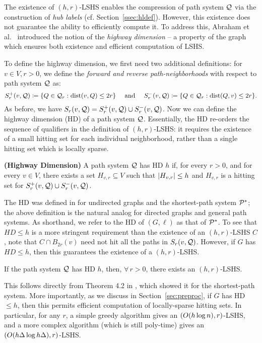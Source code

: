 The existence of $(h,r)$-LSHS enables the compression of path system $\mathcal{Q}$ via the construction of \emph{hub labels} (cf. Section~\ref{ssec:hldef}). However, this existence does not guarantee the ability to efficiently compute it. 
To address this, Abraham et al.~\cite{highway2013} introduced the notion of the \emph{highway dimension} -- a property of the graph which ensures both existence and efficient computation of LSHS. 

To define the highway dimension, we first need two additional definitions:
for $v\in V, r>0$, we define the \emph{forward and reverse path-neighborhoods} with respect to path system $\mathcal{Q}$ as: 
\[
S_r^+(v,\calQ) \defeq\crl*{Q\in\calQ_r: \dist(v,Q)\leq 2r} \quad\text{ and }\quad
S_r^-(v,\calQ) \defeq\crl*{Q\in\calQ_r: \dist(Q,v)\leq 2r}.
\]
As before, we have $S_r(v,\mathcal{Q}) = S_r^+(v,\mathcal{Q})\cup S_r^-(v,\mathcal{Q})$. Now we can define the highway dimension (HD) of a path system $\mathcal{Q}$. Essentially, the HD re-orders the sequence of qualifiers in the definition of $(h,r)$-LSHS: it requires the existence of a small hitting set for each individual neighborhood, rather than a single hitting set which is locally sparse. 
\begin{definition}
	\label{def:hddef}
	\textbf{(Highway Dimension)}
	A path system $\mathcal{Q}$ has HD $h$ if, for every $r>0$, and for every $v\in V$, there exists a set $H_{v,r}\subseteq V$ such that $\lvert H_{v,r}\rvert\leq h$ and $H_{v,r}$ is a hitting set for $S_r^+(v,\mathcal{Q})\cup S_r^-(v,\mathcal{Q})$.
\end{definition}
The HD was defined in \cite{highway2013} for undirected graphs and the shortest-path system $\mathcal{P}^*$; the above definition is the natural analog for directed graphs and general path systems.
As shorthand, we refer to the HD of $(G,\ell)$ as that of $\mathcal{P}^*$. 
To see that $HD\leq h$ is a more stringent requirement than the existence of an $(h,r)$-LSHS $C$, note that $C\cap B_{2r}(v)$ need not hit all the paths in $S_r(v,\mathcal{Q})$. 
However, if $G$ has $HD\leq h$, then this guarantees the existence of a $(h,r)$-LSHS.
\begin{proposition}
	If the path system $\mathcal{Q}$ has HD $h$, then, $\forall\,r>0$, there exists an $(h,r)$-LSHS.
\end{proposition}
This follows directly from Theorem 4.2 in \cite{highway2013}, which showed it for the shortest-path system. More importantly, as we discuss in Section~\ref{sec:preproc}, if $G$ has HD$\leq h$, then this permits efficient computation of locally-sparse hitting sets.
In particular, for any $r$, a simple greedy algorithm gives an $(O(h\log n),r)$-LSHS, and a more complex algorithm (which is still poly-time) gives an $(O(h\Delta\log h\Delta),r)$-LSHS.


